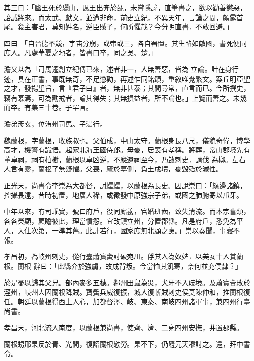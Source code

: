 \begin{pinyinscope}
 其三曰：「幽王死於驪山，厲王出奔於彘，未嘗隱諱，直筆書之，欲以勸善懲惡，詒誡將來。而太武、獻文，並遭非命，前史立紀，不異天年，言論之間，頗露首尾。殺主害君，莫知姓名，逆臣賊子，何所懼哉？今分明直書，不敢回避。」



 四曰：「自晉德不競，宇宙分崩，或帝或王，各自署置。其生略如敵國，書死便同庶人。凡處華夏之地者，皆書曰卒，同之吳、楚。」



 澹又以為「司馬遷創立紀傳已來，述者非一，人無善惡，皆為
 立論。計在身行迹，具在正書，事既無奇，不足懲勸，再述乍同銘頌，重敘唯覺繁文。案丘明亞聖之才，發揚聖旨，言『君子曰』者，無非甚泰；其間尋常，直言而已。今所撰史，竊有慕焉，可為勸戒者，論其得失；其無損益者，所不論也。」上覽而善之。未幾而卒。有集三十卷。子罕言。



 澹弟彥玄，位洧州司馬。子滿行。



 魏蘭根，字蘭根，收族叔也。父伯成，中山太守。蘭根身長八尺，儀貌奇偉，博學高才，機警有識悟。起家北海王國侍郎。母憂，居喪有孝稱。將葬，常山郡境先有董卓祠，祠有柏樹，蘭根以卓凶逆，不應遺祠至今，乃啟刺史，請伐
 為槨。左右人言有靈，蘭根了無疑懼。父喪，廬於墓側，負土成墳，憂毀殆於滅性。



 正光末，尚書令李崇為大都督，討蠕蠕，以蘭根為長史。因說崇曰：「緣邊諸鎮，控攝長遠，昔時初置，地廣人稀，或徵發中原強宗子弟，或國之肺腑寄以爪牙。



 中年以來，有司乖實，號曰府戶，役同廝養，官婚班齒，致失清流。而本宗舊類，各各榮顯，顧瞻彼此，理當憤怨。宜改鎮立州，分置郡縣。凡是府戶，悉免為平人，入仕次第，一準其舊。此計若行，國家庶無北顧之慮。」崇以奏聞，事寢不報。



 孝昌初，為岐州刺史，從行臺蕭實夤討破宛川。俘其人為奴婢，以美女十人賞蘭根。蘭根
 辭曰：「此縣介於強虜，故成背叛。今當恤其飢寒，奈何並充僕隸？」



 於是盡以歸其父兄。部內麥多五穗。鄰州田鼠為災，犬牙不入岐境。及蕭寶夤敗於涇州，岐州人囚蘭根降賊。寶夤兵威復振，城人復斬賊刺史侯莫陳仲和，推蘭根復任。朝廷以蘭根得西土人心，加都督涇、岐、東秦、南岐四州諸軍事，兼四州行臺尚書。



 孝昌末，河北流人南度，以蘭根兼尚書，使齊、濟、二兗四州安撫，并置郡縣。



 蘭根甥邢杲反於青、光間，復詔蘭根慰勞。杲不下，仍隨元天穆討之。還，拜中書令。




\end{pinyinscope}
